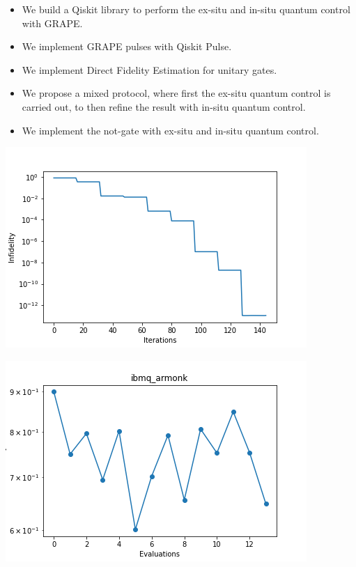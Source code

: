 \documentclass[12pt,aspectratio=169]{beamer}
\begin{document}
	\begin{frame}
		\begin{itemize}
			\item We build a Qiskit library to perform the ex-situ and in-situ quantum control with GRAPE.\\
			\vspace{0.1cm}
			\item We implement GRAPE pulses with Qiskit Pulse.
			\vspace{0.1cm}
			\item We implement Direct Fidelity Estimation for unitary gates.
			\vspace{0.1cm}
			\item We propose a mixed protocol, where first the ex-situ quantum control is carried out, to then refine the result with in-situ quantum control.\\
			\vspace{0.1cm}
			\item We implement the not-gate with ex-situ and in-situ quantum control.
		\end{itemize}
		
	\end{frame}
	
	\begin{frame}
		\centering
		\includegraphics[scale=0.8]{infidelity.png}
	\end{frame}
	
	\begin{frame}
		\centering
		\includegraphics[scale=0.8]{experiment.png}
	\end{frame}
\end{document}
